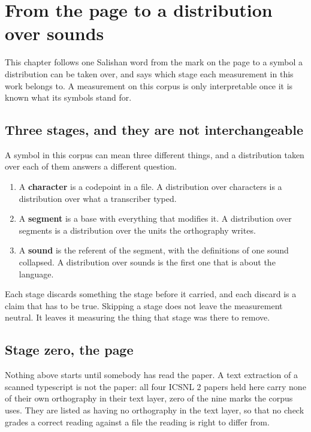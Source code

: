 \chapter{From the page to a distribution over sounds}

This chapter follows one Salishan word from the mark on the page to a symbol a distribution can be
taken over, and says which stage each measurement in this work belongs to. A measurement on this
corpus is only interpretable once it is known what its symbols stand for.

\section{Three stages, and they are not interchangeable}

A symbol in this corpus can mean three different things, and a distribution taken over each of them
answers a different question.

\begin{enumerate}
  \item A \textbf{character} is a codepoint in a file. A distribution over characters is a
        distribution over what a transcriber typed.
  \item A \textbf{segment} is a base with everything that modifies it. A distribution over segments
        is a distribution over the units the orthography writes.
  \item A \textbf{sound} is the referent of the segment, with the definitions of one sound collapsed.
        A distribution over sounds is the first one that is about the language.
\end{enumerate}

Each stage discards something the stage before it carried, and each discard is a claim that has to
be true. Skipping a stage does not leave the measurement neutral. It leaves it measuring the thing
that stage was there to remove.

\section{Stage zero, the page}

Nothing above starts until somebody has read the paper. A text extraction of a scanned typescript is
not the paper: all four ICSNL 2 papers held here \cite{src:Elmendorf-1967, src:Hamp-1967,
src:Hess-1967, src:Kinkade-1967} carry none of their own orthography in their text layer, zero of
the nine marks the corpus uses. They are listed as having no orthography in the text layer, so that
no check grades a correct reading against a file the reading is right to differ from.

